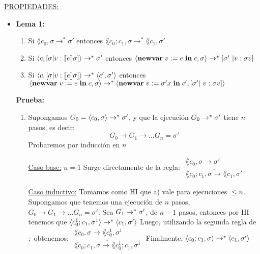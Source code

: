     \underline{PROPIEDADES:}
    \begin{itemize}
      \item \textbf{Lema 1:}
        \begin{enumerate}
          \item Si $\lang{c_0, \sigma} \rightarrow^{\ast} \sigma'$ entonces $\lang{c_0;c_1, \sigma} \rightarrow^{\ast} \lang{c_1, \sigma'}$
          \item Si $\langle c, [\sigma | v : \llbracket e\rrbracket \sigma]\rangle \rightarrow^{\ast} \sigma'$ entonces $\lang{\newvar{v := e}{c}, \sigma} \rightarrow^{\ast} [\sigma' | v : \sigma v]$
          \item Si $\langle c, [\sigma | v : \llbracket e\rrbracket \sigma]\rangle \rightarrow^{\ast} \langle c', \sigma'\rangle$ entonces $\lang{\newvar{v := e}{c}, \sigma} \rightarrow^{\ast} \lang{\newvar{v := \sigma' x}{c'}, [\sigma' | v : \sigma v]}$
        \end{enumerate}
        
        \PN \textbf{Prueba:}
        \begin{enumerate}
          \item Supongamos $G_0 = \langle c_0, \sigma\rangle \rightarrow^{\ast} \sigma'$, y que la ejecución $G_0 \rightarrow^{\ast} \sigma'$ tiene $n$ pasos, es decir:
        \[
          G_0 \rightarrow G_1 \rightarrow ... G_n = \sigma'
        \]
        \PN Probaremos por inducción en $n$

        \underline{Caso base:} $n = 1$ Surge directamente de la regla:
        $\begin{array}{cll}
          \lang{c_0, \sigma} \rightarrow \sigma' \\
          \overline{\lang{c_0;c_1, \sigma} \rightarrow \lang{c_1, \sigma'}}
        \end{array}$

        \underline{Caso inductivo:} Tomamos como HI que a) vale para ejecuciones $\leq n$.
        \PN Supongamos que tenemos una ejecución de $n$ pasos, $G_0 \rightarrow G_1 \rightarrow ... G_n = \sigma'$.
        \PN Sea $G_1 \rightarrow^{\ast} \sigma'$, de $n-1$ pasos, entonces por HI tenemos que $\langle c_{0}^{1};c_1, \sigma^{1}\rangle \rightarrow^{\ast} \langle c_1, \sigma'\rangle$
        \PN Luego, utilizando la segunda regla de $;$ obtenemos:
        $\begin{array}{cll}
          \lang{c_0, \sigma} \rightarrow \lang{c_{0}^{1}, \sigma^{1}} \\
          \overline{\lang{c_0;c_1, \sigma} \rightarrow \lang{c_{0}^{1}; c_1, \sigma^{1}}}
        \end{array}$
        \PN Finalmente, $\langle c_0;c_1, \sigma\rangle \rightarrow^{\ast} \langle c_1, \sigma'\rangle$


\end{enumerate}
\end{itemize}
